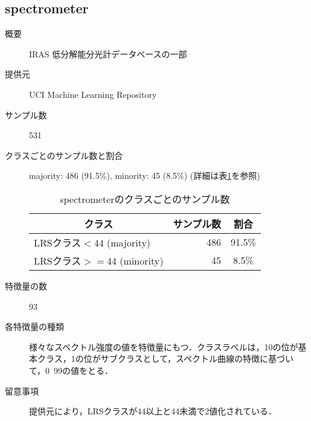 \subsection{spectrometer}
\begin{description}
    \item[概要] IRAS 低分解能分光計データベースの一部\cite{spectrometer}
    \item[提供元] UCI Machine Learning Repository
    \item[サンプル数] 531
    \item[クラスごとのサンプル数と割合] majority: 486 (91.5\%), minority: 45 (8.5\%) (詳細は表\ref{tab:spectrometer}を参照)

        \begin{table}[htbp]
            \centering
            \caption{spectrometerのクラスごとのサンプル数}
            \label{tab:spectrometer}
            \begin{tabular}{lrc} \hline
                \multicolumn{1}{c}{クラス}&
                \multicolumn{1}{c}{サンプル数}&
                \multicolumn{1}{c}{割合}\\
                \hline
                \hline
                LRSクラス$<$44 (majority)& 486 & 91.5\% \\
                LRSクラス$>=$44 (minority)& 45 & 8.5\% \\
                \hline
            \end{tabular}
        \end{table}

    \item[特徴量の数] 93
    \item[各特徴量の種類] 様々なスペクトル強度の値を特徴量にもつ．クラスラベルは，10の位が基本クラス，1の位がサブクラスとして，スペクトル曲線の特徴に基づいて，0~99の値をとる．
    \item[留意事項] 提供元により，LRSクラスが44以上と44未満で2値化されている．
        
\end{description}


